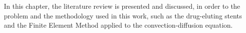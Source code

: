 In this chapter, the literature review is presented and discussed,
 in order to the problem and the methodology used in this work, 
such as the drug-eluting stents and 
the Finite Element Method applied to
 the convection-diffusion equation.
